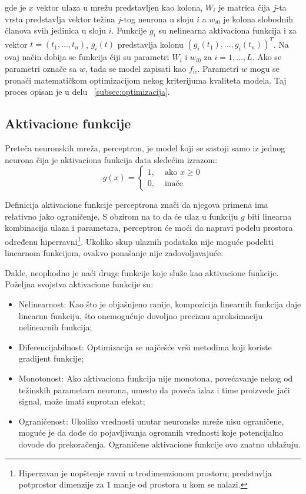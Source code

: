 gde je $x$ vektor ulaza u mrežu predstavljen kao kolona, $W_i$ je matrica čija $j$-ta vrsta predstavlja vektor težina $j$-tog neurona u sloju $i$ a $w_{i0}$ je kolona slobodnih članova svih jedinica u sloju $i$. Funkcije $g_i$ su nelinearna aktivaciona funkcija i za vektor $t=(t_1, ..., t_n)$, $g_i(t)$ predstavlja kolonu $(g_i(t_1), ..., g_i(t_n))^T$. Na ovaj način dobija se funkcija čiji su parametri $W_i$ i $w_{i0}$ za $i=1,...,L$. Ako se parametri označe sa $w$, tada se model zapisati kao $f_w$. Parametri $w$ mogu se pronaći matematičkom optimizacijom nekog kriterijuma kvaliteta modela. Taj proces opisan je u delu ~\ref{subsec:optimizacija}.

\subsection{Aktivacione funkcije}

Preteča neuronskih mreža, perceptron, je model koji se sastoji samo iz jednog neurona čija je aktivaciona funkcija data sledećim izrazom:
\begin{equation}
	g(x)=
	\begin{cases}
		1, 	& \text{~ako~} x \geq 0 \\
		0, 	& \text{~inače}
	\end{cases}
\end{equation} 

Definicija aktivacione funkcije perceptrona znači da njegova primena ima relativno jako ograničenje. S obzirom na to da će ulaz u funkciju $g$ biti linearna kombinacija ulaza i parametara, perceptron će moći da napravi podelu prostora određenu hiperravni\footnote{Hiperravan je uopštenje ravni u trodimenzionom prostoru; predstavlja potprostor dimenzije za $1$ manje od prostora u kom se nalazi.}. Ukoliko skup ulaznih podataka nije moguće podeliti linearnom funkcijom, ovakvo ponašanje nije zadovoljavajuće.
\par
Dakle, neophodno je naći druge funkcije koje služe kao aktivacione funkcije. Poželjna svojstva aktivacione funkcije su:
\begin{itemize}
	\item Nelinearnost: Kao što je objašnjeno ranije, kompozicija linearnih funkcija daje linearnu funkciju, što onemogućuje dovoljno preciznu aproksimaciju nelinearnih funkcija;
	\item Diferencijabilnost: Optimizacija se najčešće vrši metodima koji koriste gradijent funkcije;
	\item Monotonost: Ako aktivaciona funkcija nije monotona, povećavanje nekog od težinskih parametara neurona, umesto da poveća izlaz i time proizvede jači signal, može imati suprotan efekat;
	\item Ograničenost: Ukoliko vrednosti unutar neuronske mreže nisu ograničene, moguće je da dođe do pojavljivanja ogromnih vrednosti koje potencijalno dovode do prekoračenja. Ograničene aktivacione funkcije ovo znatno ublažuju. 
\end{itemize}

